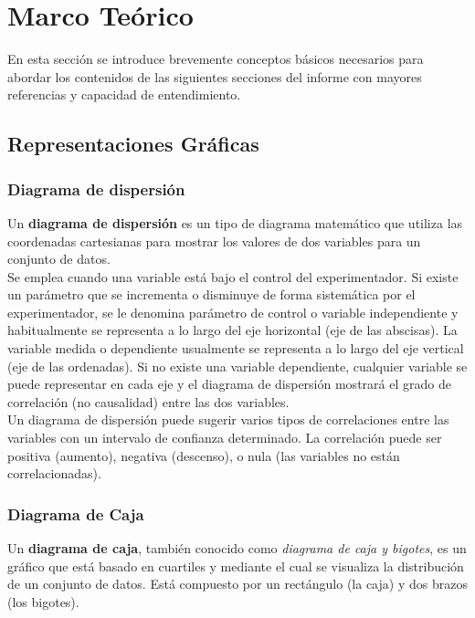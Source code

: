\documentclass[osajnl,twocolumn,showpacs,superscriptaddress,10pt,floatfix]{revtex4-1} %
\begin{document}
\section{Marco Teórico}

En esta sección se introduce brevemente conceptos básicos necesarios para abordar los contenidos de las siguientes secciones del informe con mayores referencias y capacidad de entendimiento. \\

\subsection{Representaciones Gráficas}

\subsubsection{Diagrama de dispersión}

Un \textbf{diagrama de dispersión} es un tipo de diagrama matemático que utiliza las coordenadas cartesianas para mostrar los valores de dos variables para un conjunto de datos. \\

Se emplea cuando una variable está bajo el control del experimentador. Si existe un parámetro que se incrementa o disminuye de forma sistemática por el experimentador, se le denomina parámetro de control o variable independiente y habitualmente se representa a lo largo del eje horizontal (eje de las abscisas). La variable medida o dependiente usualmente se representa a lo largo del eje vertical (eje de las ordenadas). Si no existe una variable dependiente, cualquier variable se puede representar en cada eje y el diagrama de dispersión mostrará el grado de correlación (no causalidad) entre las dos variables. \\

Un diagrama de dispersión puede sugerir varios tipos de correlaciones entre las variables con un intervalo de confianza determinado. La correlación puede ser positiva (aumento), negativa (descenso), o nula (las variables no están correlacionadas). 

\subsubsection{Diagrama de Caja}

Un \textbf{diagrama de caja}, también conocido como \textit{diagrama de caja y bigotes}, es un gráfico que está basado en cuartiles y mediante el cual se visualiza la distribución de un conjunto de datos. Está compuesto por un rectángulo (la caja) y dos brazos (los bigotes). \\
\end{document}

